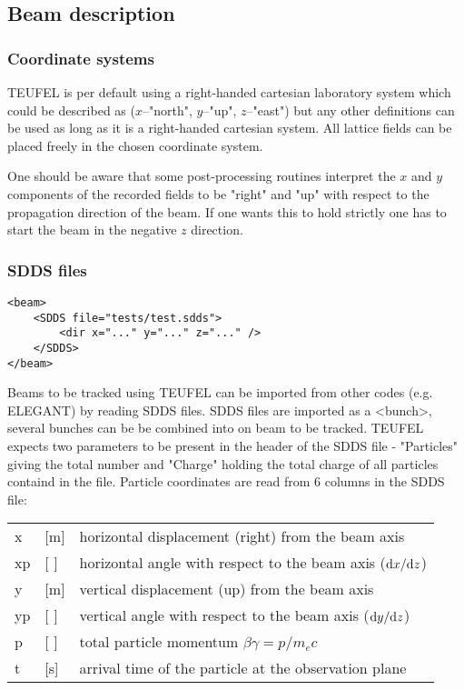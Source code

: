\documentclass[11pt]{article}
\begin{document}
\subsection{Beam description}

\subsubsection{Coordinate systems}

TEUFEL is per default using a right-handed cartesian laboratory system which could be described
as ($x$--"north", $y$--"up", $z$--"east") but any other definitions can be used as long as it is
a right-handed cartesian system. All lattice fields can be placed freely in the chosen coordinate system.

One should be aware that some post-processing routines interpret the $x$ and $y$ components
of the recorded fields to be "right" and "up" with respect to the propagation direction
of the beam. If one wants this to hold strictly one has to start the beam in the negative $z$ direction.

\subsubsection{SDDS files}

\begin{lstlisting}
<beam>
    <SDDS file="tests/test.sdds">
        <dir x="..." y="..." z="..." />
    </SDDS>
</beam>
\end{lstlisting}

Beams to be tracked using TEUFEL can be imported from other codes (e.g. ELEGANT)
by reading SDDS files. SDDS files are imported as a <bunch>, several bunches can be
be combined into on beam to be tracked. TEUFEL expects two parameters to be present
in the header of the SDDS file - "Particles" giving the total number and
"Charge" holding the total charge of all particles containd in the file.
Particle coordinates are read from 6 columns in the SDDS file:
\\[1ex]
\begin{tabular}{lll}
x & [m] & horizontal displacement (right) from the beam axis \\
xp & [ ] & horizontal angle with respect to the beam axis (${\rm d}x/{\rm d}z$) \\
y & [m] & vertical displacement (up) from the beam axis \\
yp & [ ] & vertical angle with respect to the beam axis (${\rm d}y/{\rm d}z$) \\
p & [ ] & total particle momentum $\beta\gamma = p/m_e c$ \\
t & [s] & arrival time of the particle at the observation plane \\
\end{tabular}\\
\end{document}
